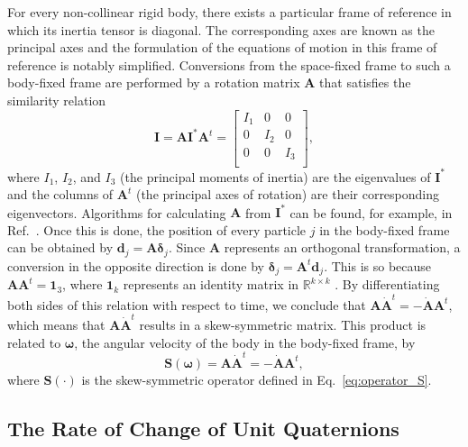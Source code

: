 \documentclass[aip,jcp,reprint,amsmath,amssymb,amsfont]{revtex4-1}
\newcommand{\mt}[1]{\boldsymbol{\mathbf{#1}}}           %
\newcommand{\vt}[1]{\boldsymbol{\mathbf{#1}}}           %
\newcommand{\tr}[1]{#1^t}                               %
\begin{document}
For every non-collinear rigid body, there exists a particular frame of reference in which its inertia tensor is diagonal. The corresponding axes are known as the principal axes and the formulation of the equations of motion in this frame of reference is notably simplified. Conversions from the space-fixed frame to such a body-fixed frame are performed by a rotation matrix $\mt A$ that satisfies the similarity relation\citep{Goldstein2002}
\[
{\mt I} = {\mt A} {\mt I}^\ast \tr{\mt A} = \left[ \begin{array}{ccc}
I_1 &   0 &   0 \\
  0 & I_2 &   0 \\
  0 &   0 & I_3 \\
\end{array} \right],
\]
where $I_1$, $I_2$, and $I_3$ (the principal moments of inertia) are the eigenvalues of ${\mt I}^\ast$ and the columns of $\tr{\mt A}$ (the principal axes of rotation) are their corresponding eigenvectors. Algorithms for calculating $\mt A$ from $\mt I^\ast$ can be found, for example, in Ref.~. Once this is done, the position of every particle $j$ in the body-fixed frame can be obtained by ${\vt d}_j = {\mt A} {\vt \delta}_j$. Since $\mt A$ represents an orthogonal transformation, a conversion in the opposite direction is done by ${\vt \delta}_j = \tr{\mt A} {\vt d}_j$.\cite{Goldstein2002} This is so because $\mt A \tr{\mt A} = \mt 1_3$, where $\mt 1_k$ represents an identity matrix in $\mathbb{R}^{k \times k}$ . By differentiating both sides of this relation with respect to time, we conclude that ${\mt A} \tr{\dot{\mt A}} = -\dot{\mt A} \tr{\mt A}$, which means that $\mt A \tr{\dot{\mt A}}$ results in a skew-symmetric matrix. This product is related to $\vt \omega$, the angular velocity of the body in the body-fixed frame, by\cite{Haug1989}
\begin{equation}
\label{eq:relation_A_omega}
\mt S(\vt \omega) = \mt A \tr{\dot{\mt A}} = -\dot{\mt A} \tr{\mt A},
\end{equation}
where $\mt S(\cdot)$ is the skew-symmetric operator defined in Eq.~\ref{eq:operator_S}.

\subsection{The Rate of Change of Unit Quaternions}
\label{sec:eulerparameters}
\end{document}
